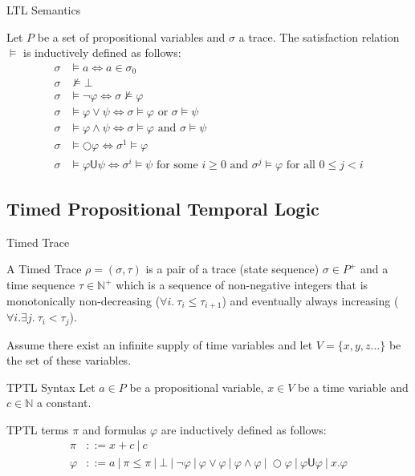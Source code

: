\documentclass[a4paper]{article}
\newcommand{\U}{\mathsf{U}}
\newcommand{\tand}{\text{ and }}
\newcommand{\tor}{\text{ or }}
\newcommand{\fsome}{\text{ for some }}
\newcommand{\fall}{\text{ for all }}
\begin{document}
\begin{defn}{LTL Semantics}

  Let $P$ be a set of propositional variables and $\sigma$ a trace. The satisfaction relation $\vDash$ is inductively defined as follows:
\begin{align*}
  \sigma &\vDash a \iff a \in \sigma_0\\
  \sigma &\nvDash \bot\\
  \sigma &\vDash \neg \varphi \iff \sigma \nvDash \varphi\\
  \sigma &\vDash \varphi \lor \psi \iff \sigma \vDash \varphi \tor \sigma \vDash \psi\\
  \sigma &\vDash \varphi \land \psi \iff \sigma \vDash \varphi \tand \sigma \vDash \psi\\
  \sigma &\vDash \bigcirc \varphi \iff \sigma^1 \vDash \varphi\\
  \sigma &\vDash \varphi \U \psi \iff \sigma^i \vDash \psi \fsome i \geq 0 \tand \sigma^j \vDash \varphi \fall 0 \leq j < i
\end{align*}

\end{defn}

\subsection{Timed Propositional Temporal Logic}
\begin{defn}{Timed Trace}

  A Timed Trace $\rho = (\sigma,\tau)$ is a pair of a trace (state sequence) $\sigma \in P^+$ and a time sequence $\tau \in \mathbb{N}^+$ which is a sequence of non-negative integers that is monotonically non-decreasing ($\forall i. ~\tau_i \leq \tau_{i+1}$) and eventually always increasing ($\forall i. \exists j. ~\tau_i < \tau_j$).
\end{defn}

Assume there exist an infinite supply of time variables  and let $V=\{x,y,z...\}$ be the set of these variables.

\begin{defn}{TPTL Syntax}
  Let $a\in P$ be a propositional variable, $x\in V$ be a time variable and $c\in\mathbb{N}$ a constant.

  TPTL terms $\pi$ and formulas $\varphi$ are inductively defined as follows:
  \begin{align*}
    \pi &::= x + c ~|~ c\\
    \varphi &::= a ~|~ \pi \leq \pi ~|~ \bot ~|~ \neg \varphi ~|~\varphi \lor \varphi ~|~ \varphi \land \varphi ~|~ \bigcirc \varphi ~|~ \varphi \U \varphi ~|~ x. \varphi
  \end{align*}
\end{defn}
\end{document}
